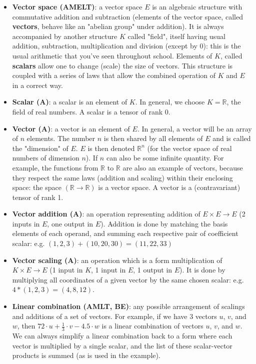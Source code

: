 \documentclass{article}
\begin{document}
\begin{itemize}

	\item \textbf{Vector space (AMELT)}: a vector space $E$ is an algebraic structure with commutative addition and subtraction (elements of the vector space, called \textbf{vectors}, behave like an "abelian group" under addition). It is always accompanied by another structure $K$ called "field", itself having usual addition, subtraction, multiplication and division (except by 0): this is the usual arithmetic that you've seen throughout school. Elements of $K$, called \textbf{scalars} allow one to change (scale) the size of vectors. This structure is coupled with a series of laws that allow the combined operation of $K$ and $E$ in a correct way.

	\item \textbf{Scalar (A)}: a scalar is an element of $K$. In general, we choose $K = \mathbb{R}$, the field of real numbers. A scalar is a tensor of rank 0.

	\item \textbf{Vector (A)}: a vector is an element of $E$. In general, a vector will be an array of $n$ elements. The number $n$ is then shared by all elements of $E$ and is called the "dimension" of $E$. $E$ is then denoted $\mathbb{R}^n$ (for the vector space of real numbers of dimension $n$). If $n$ can also be some infinite quantity. For example, the functions from $\mathbb{R}$ to $\mathbb{R}$ are also an example of vectors, because they respect the same laws (addition and scaling) within their enclosing space: the space $(\mathbb{R} \rightarrow \mathbb{R})$ is a vector space. A vector is a (contravariant) tensor of rank 1.

	\item \textbf{Vector addition (A)}: an operation representing addition of $E \times E \rightarrow E$ (2 inputs in $E$, one output in $E$). Addition is done by matching the basis elements of each operand, and summing each respective pair of coefficient scalar: e.g. $(1, 2, 3) + (10, 20, 30) = (11, 22, 33)$

	\item \textbf{Vector scaling (A)}: an operation which is a form multiplication of $K \times E \rightarrow E$ (1 input in $K$, 1 input in $E$, 1 output in $E$). It is done by multiplying all coordinates of a given vector by the same chosen scalar: e.g. $4 * (1, 2, 3) = (4, 8, 12)$.

	\item \textbf{Linear combination (AMLT, BE)}: any possible arrangement of scalings and additions of a set of vectors. For example, if we have 3 vectors $u$, $v$, and $w$, then $72 \cdot u + \frac{1}{3} \cdot v - 4.5 \cdot w$ is a linear combination of vectors $u$, $v$, and $w$. We can always simplify a linear combination back to a form where each vector is multiplied by a single scalar, and the list of these scalar-vector products is summed (as is used in the example).


\end{itemize}
\end{document}
